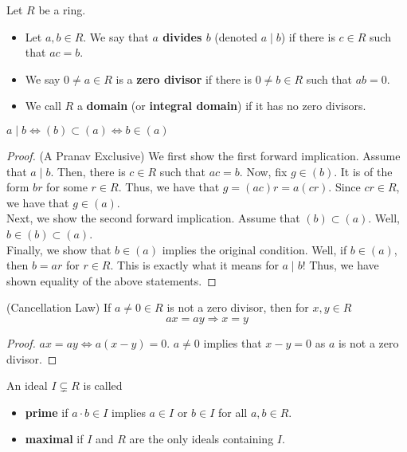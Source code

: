 \begin{defn}
    Let $R$ be a ring.
    \begin{itemize}
        \item Let $a,b \in R$. We say that \textbf{$a$ divides $b$} (denoted $a \mid b$)
        if there is $c \in R$ such that $ac = b$.
        \item We say $0 \neq a \in R$ is a \textbf{zero divisor} if there is
        $0 \neq b \in R$ such that $ab = 0$.
        \item We call $R$ a \textbf{domain} (or \textbf{integral domain}) if it has
        no zero divisors.
    \end{itemize}
\end{defn}
\begin{fact}
    $a \mid b \iff (b) \subset (a) \iff b \in (a)$
\end{fact}
\begin{proof} (A Pranav Exclusive)
    We first show the first forward implication. Assume that $a \mid b$. Then, there is
    $c \in R$ such that $ac = b$. Now, fix $g \in (b)$. It is of the form $br$ for some
    $r \in R$. Thus, we have that $g = (ac)r = a(cr)$. Since $cr \in R$, we have that $g \in (a)$. \\
    Next, we show the second forward implication. Assume that $(b) \subset (a)$. Well,
    $b \in (b) \subset (a)$. \\
    Finally, we show that $b \in (a)$ implies the original condition. Well, if $b \in (a)$, then
    $b = ar$ for $r \in R$. This is exactly what it means for $a \mid b$! Thus, we have
    shown equality of the above statements.
\end{proof}
\begin{fact} (Cancellation Law) If $a \neq 0 \in R$ is not a zero divisor, then
    for $x,y \in R$
    $$
    ax = ay \Rightarrow x = y
    $$
\end{fact}
\begin{proof}
    $ax = ay \iff a(x - y) = 0$. $a \neq 0$ implies that $x - y = 0$ as $a$ is not
    a zero divisor.
\end{proof}
\begin{defn}
    An ideal $I \subsetneq R$ is called
    \begin{itemize}
        \item \textbf{prime} if $a \cdot b \in I$ implies $a \in I$ or $b \in I$ for all $a,b \in R$.
        \item \textbf{maximal} if $I$ and $R$ are the only ideals containing $I$.
    \end{itemize}
\end{defn}
